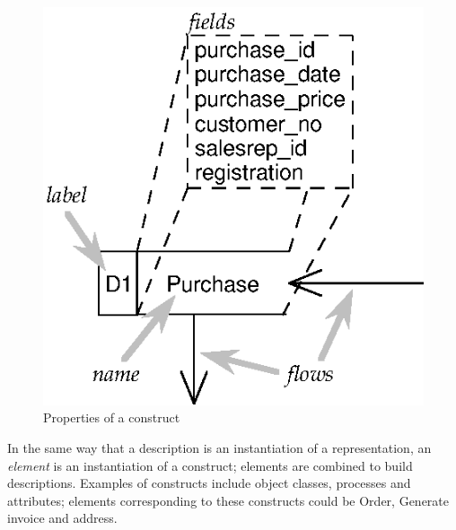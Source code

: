 \documentclass[11pt,oribibl]{llncs}
\begin{document}

\begin{figure}[htbp]
	\centering
	\includegraphics{Properties}
	\caption{Properties of a construct}
	\label{Fig.MultipleRepresentations.Properties}
\end{figure}


In the same way that a description is an instantiation of a representation, an \emph{element} is an instantiation of a construct; elements are combined to build descriptions. Examples of constructs include object classes, processes and attributes; elements corresponding to these constructs could be \textsf{Order}, \textsf{Generate invoice} and \textsf{address}.


\newcommand{\Representation}[3]{\ensuremath{\mathfrak{#1}(#2,#3)}}
\newcommand{\RepresentationS}[4]{\ensuremath{\mathfrak{#1}_{#2}(#3,#4)}}
\newcommand{\Rep}[1]{\ensuremath{\mathfrak{#1}}}
\newcommand{\RepS}[2]{\ensuremath{\mathfrak{#1}_{#2}}}

\newcommand{\Description}[4]{\ensuremath{#1(#2,#3,#4)}}
\newcommand{\rDescription}[5]{\ensuremath{#1(#2,\Representation{#3}{#4}{#5})}}
\newcommand{\rDescriptionS}[6]{\ensuremath{#1(#2,\RepresentationS{#3}{#4}{#5}{#6})}}
\newcommand{\shortDescription}[3]{\ensuremath{#1(#2,\mathfrak{#3})}}
\newcommand{\shortDescriptionS}[4]{\ensuremath{#1(#2,\mathfrak{#3}_{#4})}}
\end{document}
